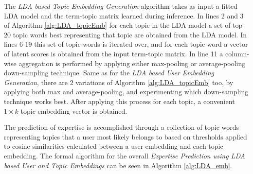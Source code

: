             The \emph{LDA based Topic Embedding Generation} algorithm takes as input a fitted LDA model and the term-topic matrix learned during inference. In lines 2 and 3 of Algorithm \ref{alg:LDA_topicEmb} for each topic in the LDA model a set of top-20 topic words best representing that topic are obtained from the LDA model. In lines 6-19 this set of topic words is iterated over, and for each topic word a vector of latent scores is obtained from the input term-topic matrix. In line 11 a column-wise aggregation is performed by applying either max-pooling or average-pooling down-sampling technique. Same as for the \emph{LDA based User Embedding Generation}, there are 2 variations of Algorithm \ref{alg:LDA_topicEmb} too, by applying both max and average-pooling, and experimenting which down-sampling technique works best. After applying this process for each topic, a convenient $1 \times k$ topic embedding vector is obtained.
            
            The prediction of expertise is accomplished through a collection of topic words representing topics that a user most likely belongs to based on thresholds applied to cosine similarities calculated between a user embedding and each topic embedding. The formal algorithm for the overall \emph{Expertise Prediction using LDA based User and Topic Embeddings} can be seen in Algorithm \ref{alg:LDA_emb}.
        
